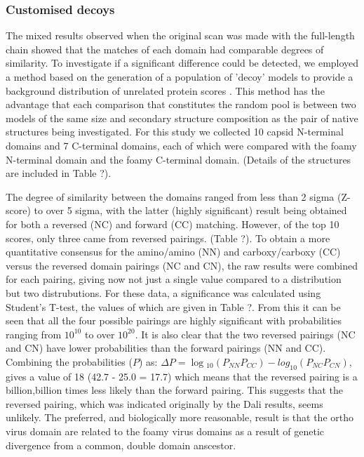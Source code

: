 \subsubsection{Customised decoys}

The mixed results observed when the original scan was made with the full-length chain showed that
the matches of each domain had comparable degrees of similarity.    To investigate if a significant
difference could be detected, we employed a method based on the generation of a population of
'decoy' models to provide a background distribution of unrelated protein scores \cite{Taylor}.
This method has the advantage that each comparison that constitutes the random pool is between
two models of the same size and secondary structure composition as the pair of native structures
being investigated.
For this study we collected 10 capsid N-terminal domains and 7 C-terminal domains, each of which 
were compared with the foamy N-terminal domain and the foamy C-terminal domain.
(Details of the structures are included in Table ?).


The degree of similarity between the domains ranged from less than 2 sigma (Z-score)
to over 5 sigma, with the latter (highly significant) result being obtained for both
a reversed (NC) and forward (CC) matching.   However, of the top 10 scores, only
three came from reversed pairings.  (Table ?).  To obtain a more quantitative consensus
for the amino/amino (NN) and carboxy/carboxy (CC) versus the reversed domain pairings
(NC and CN), the raw results were combined for each pairing, giving now not just a
single value compared to a distribution but two distrubutions.   For these data,
a significance was calculated using Student's T-test, the values of which are given
in Table ?.   From this it can be seen that all the four possible pairings are
highly significant with probabilities ranging from $10^{10}$ to over $10^{20}$.
It is also clear that the two reversed pairings (NC and CN) have lower probabilities
than the forward pairings (NN and CC).   Combining the probabilities ($P$) as:
$\Delta P = \log{_10}(P_{NN} P_{CC}) - log_{10}(P_{NC} P_{CN})$,
gives a value of 18 (42.7 - 25.0 = 17.7) which means that the reversed pairing is
a billion,billion times less likely than the forward pairing.  This suggests that
the reversed pairing, which was indicated originally by the Dali results, seems unlikely. 
The preferred, and biologically more reasonable, result is that the ortho virus
domain are related to the foamy virus domains as a result of genetic divergence from
a common, double domain anscestor. 

